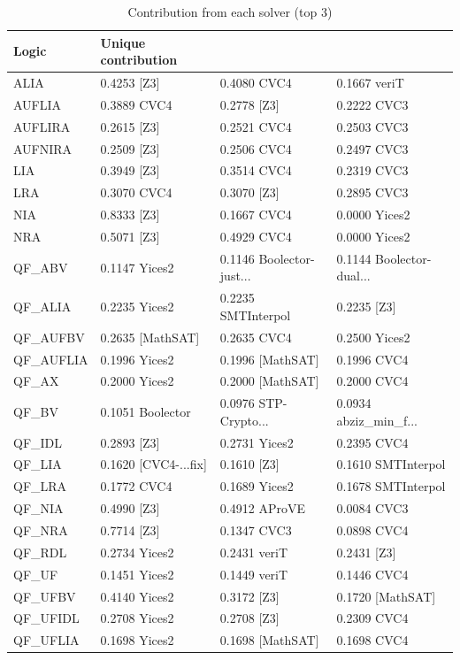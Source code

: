 \documentclass[twoside,11pt]{article}
\begin{document}
\begin{table}
\caption{Contribution from each solver (top 3)}
\label{tab:cont}
\centering\begin{tabular}{|l|lll|}
\hline
Logic & Unique contribution & & \\
\hline
ALIA & 0.4253 [Z3] & 0.4080 CVC4 & 0.1667 veriT \\
AUFLIA & 0.3889 CVC4 & 0.2778 [Z3] & 0.2222 CVC3 \\
AUFLIRA & 0.2615 [Z3] & 0.2521 CVC4 & 0.2503 CVC3 \\
AUFNIRA & 0.2509 [Z3] & 0.2506 CVC4 & 0.2497 CVC3 \\
LIA & 0.3949 [Z3] & 0.3514 CVC4 & 0.2319 CVC3 \\
LRA & 0.3070 CVC4 & 0.3070 [Z3] & 0.2895 CVC3 \\
NIA & 0.8333 [Z3] & 0.1667 CVC4 & 0.0000 Yices2 \\
NRA & 0.5071 [Z3] & 0.4929 CVC4 & 0.0000 Yices2 \\
QF\_ABV & 0.1147 Yices2 & 0.1146 Boolector-just... & 0.1144 Boolector-dual... \\
QF\_ALIA & 0.2235 Yices2 & 0.2235 SMTInterpol & 0.2235 [Z3] \\
QF\_AUFBV & 0.2635 [MathSAT] & 0.2635 CVC4 & 0.2500 Yices2 \\
QF\_AUFLIA & 0.1996 Yices2 & 0.1996 [MathSAT] & 0.1996 CVC4 \\
QF\_AX & 0.2000 Yices2 & 0.2000 [MathSAT] & 0.2000 CVC4 \\
QF\_BV & 0.1051 Boolector & 0.0976 STP-Crypto... & 0.0934 abziz\_min\_f... \\
QF\_IDL & 0.2893 [Z3] & 0.2731 Yices2 & 0.2395 CVC4 \\
QF\_LIA & 0.1620 [CVC4-...fix] & 0.1610 [Z3] & 0.1610 SMTInterpol \\
QF\_LRA & 0.1772 CVC4 & 0.1689 Yices2 & 0.1678 SMTInterpol \\
QF\_NIA & 0.4990 [Z3] & 0.4912 AProVE & 0.0084 CVC3 \\
QF\_NRA & 0.7714 [Z3] & 0.1347 CVC3 & 0.0898 CVC4 \\
QF\_RDL & 0.2734 Yices2 & 0.2431 veriT & 0.2431 [Z3] \\
QF\_UF & 0.1451 Yices2 & 0.1449 veriT & 0.1446 CVC4 \\
QF\_UFBV & 0.4140 Yices2 & 0.3172 [Z3] & 0.1720 [MathSAT] \\
QF\_UFIDL & 0.2708 Yices2 & 0.2708 [Z3] & 0.2309 CVC4 \\
QF\_UFLIA & 0.1698 Yices2 & 0.1698 [MathSAT] & 0.1698 CVC4 \\

\end{tabular}
\end{table}
\end{document}
